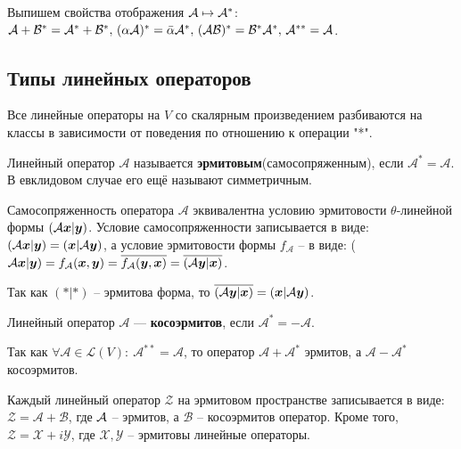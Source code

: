 Выпишем свойства отображения $\mathcal A \mapsto \mathcal A^*$: $\mathcal A + \mathcal{B}^* = \mathcal A^* + \mathcal{B}^*, \, (\alpha \mathcal A)^* = \bar{\alpha} \mathcal A^*, \, (\mathcal A \mathcal{B})^* = \mathcal{B}^* \mathcal A^*, \, \mathcal A^{* *} = \mathcal A$.

\subsection{Типы линейных операторов}
Все линейные операторы на $V$ со скалярным произведением разбиваются на классы в зависимости от поведения по отношению к операции "*".
\begin{to_def} 
	Линейный оператор $\mathcal{A}$ называется \textbf{эрмитовым}(самосопряженным), если $\mathcal{A}^* = \mathcal{A}$. В евклидовом случае его ещё называют симметричным.
\end{to_def}



Самосопряженность оператора $\mathcal{A}$ эквивалентна условию эрмитовости $\theta$-линейной формы $(\mathcal{A} \mbox{\boldmath $x$}|\mbox{\boldmath $y$})$. 
Условие самосопряженности записывается в виде: $(\mathcal A \mbox{\boldmath $x$} | \mbox{\boldmath $y$}) = (\mbox{\boldmath $x$}| \mathcal 	A \mbox{\boldmath $y$})$, 
а условие эрмитовости формы $f_\mathcal{A}$ -- в виде: ($\mathcal{A} \mbox{\boldmath $x$} | \mbox{\boldmath $y$}) = f_\mathcal{A}(\mbox{\boldmath $x$},\mbox{\boldmath $y$}) = \overline{f_\mathcal{A}(\mbox{\boldmath $y$}, \mbox{\boldmath $x$})} = \overline{(\mathcal{A} \mbox{\boldmath $y$}|\mbox{\boldmath $x$})}$.

Так как $(*|*)$ -- эрмитова форма, то $\overline{(\mathcal{A} \mbox{\boldmath $y$}|\mbox{\boldmath $x$})} = (\mbox{\boldmath $x$}|\mathcal{A} \mbox{\boldmath $y$})$.

\begin{to_def} 
	Линейный оператор $\mathcal{A}$ --- \textbf{косоэрмитов}, если $\mathcal A^* = -\mathcal A$.
\end{to_def}

Так как $\forall \mathcal{A}\in \mathcal{L}(V):\: \mathcal A^{* *} = \mathcal{A}$, то оператор $\mathcal{A} + \mathcal{A}^*$ эрмитов, а $\mathcal{A} - \mathcal{A}^*$ косоэрмитов. 

\begin{to_thr} 
	Каждый линейный оператор $\mathcal{Z}$ на эрмитовом пространстве записывается в виде: $\mathcal{Z} = \mathcal{A} + \mathcal{B}$, где  $\mathcal A$ -- эрмитов, а $\mathcal{B}$ -- косоэрмитов оператор. 
	Кроме того, $\mathcal{Z} = \mathcal{X} + i \mathcal{Y}$, где $\mathcal{X}, \mathcal{Y}$ -- эрмитовы линейные операторы.
\end{to_thr}

